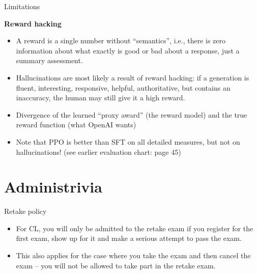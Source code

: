 \begin{vbframe}{Limitations}

\vfill

\textbf{Reward hacking}

	\begin{itemize}
		\item
                A reward is a single number without
		``semantics'', i.e., there is zero
		information about what exactly is good or
		bad about a response, just a summary
		assessment.
                
\item Hallucinations are most likely a result of reward
		hacking: if a generation is fluent,
	interesting, responsive, helpful, authoritative, but
	contains an inaccuracy, the human may still give it a
	high reward.
        \item Divergence of the learned ``proxy award'' (the
	reward model) and the true reward function (what
	OpenAI wants)
        \item Note that PPO is better than SFT on all
	detailed measures, but not on hallucinations! (see
	earlier evaluation chart: page 45)
	\end{itemize}

\vfill

\end{vbframe}


\section{Administrivia}


\begin{vbframe}{Retake policy}

\vfill

	\begin{itemize}
\item
For CL, you will
only be admitted to the retake exam if you register for the
first exam, show up for it and make a serious attempt
to pass the exam.
\item This also applies for the case where you take the exam
and then cancel the exam -- you will not be allowed to take
part in the retake exam.
\end{itemize}

\vfill

\end{vbframe}

